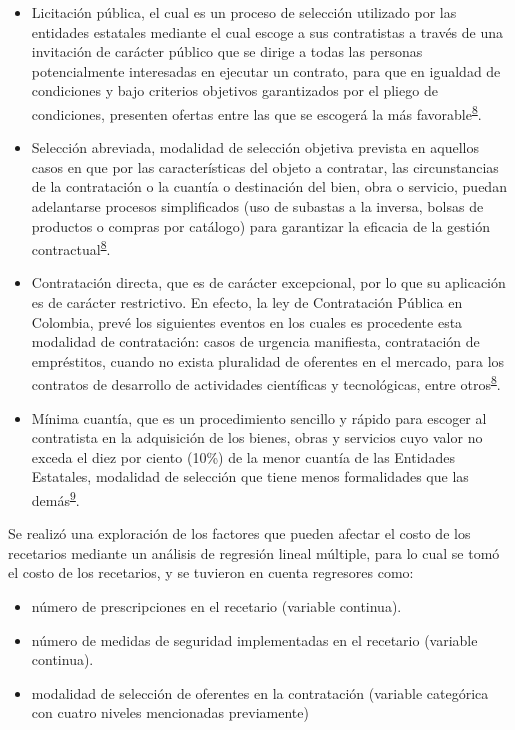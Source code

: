 \documentclass[
]{book}
\begin{document}
\begin{itemize}
\item
  Licitación pública, el cual es un proceso de selección utilizado por las entidades estatales mediante el cual escoge a sus contratistas a través de una invitación de carácter público que se dirige a todas las personas potencialmente interesadas en ejecutar un contrato, para que en igualdad de condiciones y bajo criterios objetivos garantizados por el pliego de condiciones, presenten ofertas entre las que se escogerá la más favorable\textsuperscript{\protect\hyperlink{ref-MinisteriodeRelacionesExteriores2014}{8}}.
\item
  Selección abreviada, modalidad de selección objetiva prevista en aquellos casos en que por las características del objeto a contratar, las circunstancias de la contratación o la cuantía o destinación del bien, obra o servicio, puedan adelantarse procesos simplificados (uso de subastas a la inversa, bolsas de productos o compras por catálogo) para garantizar la eficacia de la gestión contractual\textsuperscript{\protect\hyperlink{ref-MinisteriodeRelacionesExteriores2014}{8}}.
\item
  Contratación directa, que es de carácter excepcional, por lo que su aplicación es de carácter restrictivo. En efecto, la ley de Contratación Pública en Colombia, prevé los siguientes eventos en los cuales es procedente esta modalidad de contratación: casos de urgencia manifiesta, contratación de empréstitos, cuando no exista pluralidad de oferentes en el mercado, para los contratos de desarrollo de actividades científicas y tecnológicas, entre otros\textsuperscript{\protect\hyperlink{ref-MinisteriodeRelacionesExteriores2014}{8}}.
\item
  Mínima cuantía, que es un procedimiento sencillo y rápido para escoger al contratista en la adquisición de los bienes, obras y servicios cuyo valor no exceda el diez por ciento (10\%) de la menor cuantía de las Entidades Estatales, modalidad de selección que tiene menos formalidades que las demás\textsuperscript{\protect\hyperlink{ref-ColombiaCompraEficiente2019}{9}}.
\end{itemize}

Se realizó una exploración de los factores que pueden afectar el costo de los recetarios mediante un análisis de regresión lineal múltiple, para lo cual se tomó el costo de los recetarios, y se tuvieron en cuenta regresores como:

\begin{itemize}
\item
  número de prescripciones en el recetario (variable continua).
\item
  número de medidas de seguridad implementadas en el recetario (variable continua).
\item
  modalidad de selección de oferentes en la contratación (variable categórica con cuatro niveles mencionadas previamente)
\end{itemize}
\end{document}
